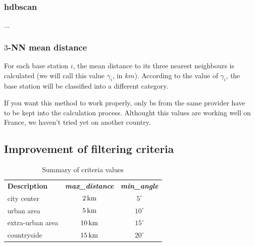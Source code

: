 \documentclass[lettersize,journal,english]{IEEEtran}
\begin{document}
        \subsubsection{\acrshort{hdbscan}}
            ...

        \subsubsection{$3$-NN mean distance}
            For each base station $i$, the mean distance to its three nearest neighbours is calculated (we will call this value $\gamma_i$, in $\unit{km}$). According to the value of $\gamma_i$, the base station will be classified into a different category.

            If you want this method to work properly, only \acrshort{bs} from the same provider have to be kept into the calculation process.
            Althought this values are working well on France, we haven't tried yet on another country.


    \subsection{Improvement of filtering criteria}
        \begin{table}
            \centering
            \caption{Summary of criteria values}
            \label{table:crit_summary}
            \begin{tabular}{lcc}
                \toprule
                \textbf{Description} & \textbf{\emph{max\_distance}} & \textbf{\emph{min\_angle}} \\
                \cmidrule(lr){1-3}
                city center & $\unit[2]{km}$ & $5^\circ$ \\
                urban area & $\unit[5]{km}$ & $10^\circ$ \\
                extra-urban area & $\unit[10]{km}$ & $15^\circ$ \\
                countryside & $\unit[15]{km}$ & $20^\circ$ \\
                \bottomrule
            \end{tabular}
        \end{table}
\end{document}
